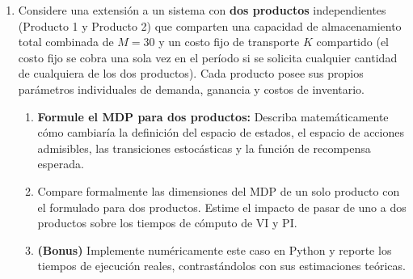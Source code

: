 \documentclass[12pt]{article}
\begin{document}
\begin{enumerate}
\item Considere una extensión a un sistema con \textbf{dos productos} independientes (Producto 1 y Producto 2) que comparten una capacidad de almacenamiento total combinada de $M=30$ y un costo fijo de transporte $K$ compartido (el costo fijo se cobra una sola vez en el período si se solicita cualquier cantidad de cualquiera de los dos productos). Cada producto posee sus propios parámetros individuales de demanda, ganancia y costos de inventario.
\begin{enumerate}
    \item \textbf{Formule el MDP para dos productos:} Describa matemáticamente cómo cambiaría la definición del espacio de estados, el espacio de acciones admisibles, las transiciones estocásticas y la función de recompensa esperada. 
    \item Compare formalmente las dimensiones del MDP de un solo producto con el formulado para dos productos. Estime el impacto de pasar de uno a dos productos sobre los tiempos de cómputo de VI y PI. 
    \item \textbf{(Bonus)} Implemente numéricamente este caso en Python y reporte los tiempos de ejecución reales, contrastándolos con sus estimaciones teóricas.
\end{enumerate}
\end{enumerate}
\end{document}

